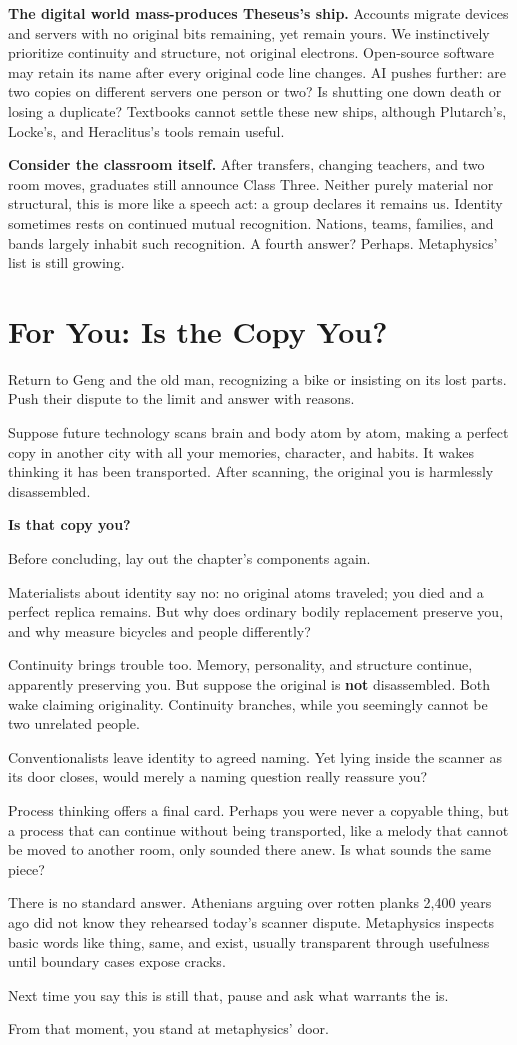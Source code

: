 \textbf{The digital world mass-produces Theseus's ship.} Accounts migrate devices and servers with no original bits remaining, yet remain yours. We instinctively prioritize continuity and structure, not original electrons. Open-source software may retain its name after every original code line changes. AI pushes further: are two copies on different servers one person or two? Is shutting one down death or losing a duplicate? Textbooks cannot settle these new ships, although Plutarch's, Locke's, and Heraclitus's tools remain useful.

\textbf{Consider the classroom itself.} After transfers, changing teachers, and two room moves, graduates still announce Class Three. Neither purely material nor structural, this is more like a speech act: a group declares it remains us. Identity sometimes rests on continued mutual recognition. Nations, teams, families, and bands largely inhabit such recognition. A fourth answer? Perhaps. Metaphysics' list is still growing.

\section{For You: Is the Copy You?}
Return to Geng and the old man, recognizing a bike or insisting on its lost parts. Push their dispute to the limit and answer with reasons.

Suppose future technology scans brain and body atom by atom, making a perfect copy in another city with all your memories, character, and habits. It wakes thinking it has been transported. After scanning, the original you is harmlessly disassembled.

\textbf{Is that copy you?}

Before concluding, lay out the chapter's components again.

Materialists about identity say no: no original atoms traveled; you died and a perfect replica remains. But why does ordinary bodily replacement preserve you, and why measure bicycles and people differently?

Continuity brings trouble too. Memory, personality, and structure continue, apparently preserving you. But suppose the original is \textbf{not} disassembled. Both wake claiming originality. Continuity branches, while you seemingly cannot be two unrelated people.

Conventionalists leave identity to agreed naming. Yet lying inside the scanner as its door closes, would merely a naming question really reassure you?

Process thinking offers a final card. Perhaps you were never a copyable thing, but a process that can continue without being transported, like a melody that cannot be moved to another room, only sounded there anew. Is what sounds the same piece?

There is no standard answer. Athenians arguing over rotten planks 2,400 years ago did not know they rehearsed today's scanner dispute. Metaphysics inspects basic words like thing, same, and exist, usually transparent through usefulness until boundary cases expose cracks.

Next time you say this is still that, pause and ask what warrants the is.

From that moment, you stand at metaphysics' door.

